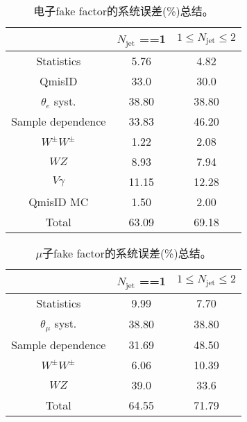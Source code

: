 \begin{table}[!ht]
\begin{center}
\begin{tabular}{c|c|c}
\hline
\hline
               &$N_\text{jet}$ ==1  &$1\leq N_{\text{jet}} \leq 2$ \\
\hline
Statistics         &5.76   &4.82   \\
QmisID             &33.0   &30.0   \\
$\theta_{e}$ syst.  &38.80   &38.80  \\
Sample dependence      &33.83   &46.20  \\
$W^{\pm}W^{\pm}$       &1.22    &2.08  \\
$WZ$                   &8.93    &7.94  \\
$V\gamma$              &11.15   &12.28      \\
QmisID MC              &1.50    &2.00      \\ 
\hline
Total                  &63.09   &69.18  \\
\hline
\hline
\end{tabular}
\caption{电子fake factor的系统误差(\%)总结。}
\label{tab:syst_ff_ele}
\end{center}
\end{table}

\begin{table}[!ht]
\begin{center}
\begin{tabular}{c|c|c}
\hline
\hline
             &$N_\text{jet}$ ==1  &$1\leq N_{\text{jet}} \leq 2$ \\
\hline
Statistics         &9.99   &7.70   \\
$\theta_{\mu}$ syst.  &38.80   &38.80  \\
Sample dependence      &31.69   &48.50  \\
$W^{\pm}W^{\pm}$       &6.06    &10.39  \\
$WZ$                   &39.0    &33.6  \\
\hline
Total                  &64.55   &71.79  \\
\hline
\hline
\end{tabular}
\caption{$\mu$子fake factor的系统误差(\%)总结。}
\label{tab:syst_ff_mu}
\end{center}
\end{table}
